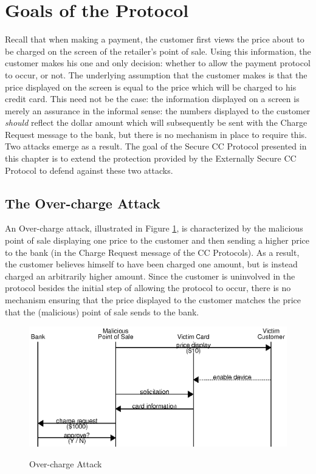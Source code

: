 \section{Goals of the Protocol}
\label{sec:secure-goals}

Recall that when making a payment, the customer first views the price about to be charged on the screen of the retailer's point of sale.
Using this information, the customer makes his one and only decision: whether to allow the payment protocol to occur, or not.
The underlying assumption that the customer makes is that the price displayed on the screen is equal to the price which will be charged to his credit card.
This need not be the case: the information displayed on a screen is merely an assurance in the informal sense:
	the numbers displayed to the customer \emph{should} reflect the dollar amount which will subsequently be sent with the Charge Request message to the bank,
    but there is no mechanism in place to require this.
Two attacks emerge as a result.
The goal of the Secure CC Protocol presented in this chapter is to extend the protection provided by the Externally Secure CC Protocol to defend against these two attacks.

\subsection{The Over-charge Attack}
\label{sec:overcharge}
An Over-charge attack, illustrated in Figure \ref{fig:attack_overcharge}, is characterized by the malicious point of sale displaying one price to the customer
	and then sending a higher price to the bank
	(in the Charge Request message of the CC Protocols).
As a result, the customer believes himself to have been charged one amount, but is instead charged an arbitrarily higher amount.
Since the customer is uninvolved in the protocol besides the initial step of allowing the protocol to occur,
	there is no mechanism ensuring that the price displayed to the customer matches the price that the (malicious) point of sale sends to the bank.

\begin{figure}
  \caption{Over-charge Attack}
  \centering
    \includegraphics{img/attack-mr-overcharge.eps}
  \label{fig:attack_overcharge}
\end{figure}

